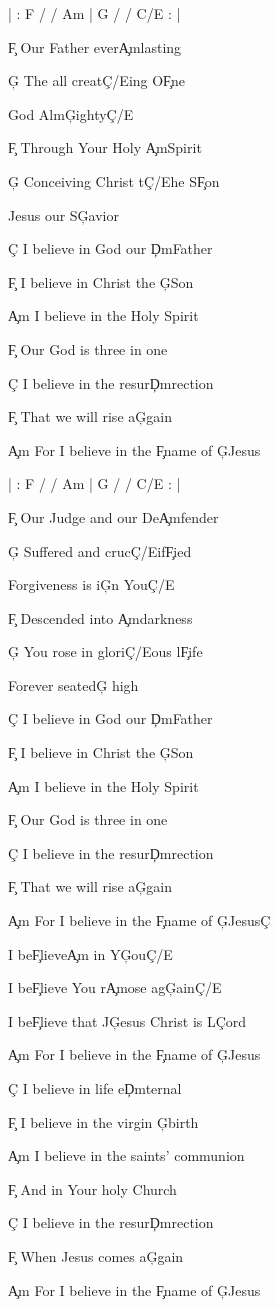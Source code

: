 \documentclass[9pt]{extarticle}
\begin{document}
\bsong

\bi
| : F / / Am  |  G / / C/E : |
\ei

\bv
\c{F} Our Father ever\c{Am}lasting

\c{G} The all creat\c{C/E}ing O\c{F}ne

God Alm\c{G}ighty\c{C/E}

\c{F} Through Your Holy \c{Am}Spirit

\c{G} Conceiving Christ t\c{C/E}he S\c{F}on

Jesus our S\c{G}avior
\ev

\bc
\c{C} I believe in God our \c{Dm}Father

\c{F} I believe in Christ the \c{G}Son

\c{Am} I believe in the Holy Spirit

\c{F} Our God is three in one

\c{C} I believe in the resur\c{Dm}rection

\c{F} That we will rise a\c{G}gain

\c{Am} For I believe in the \c{F}name of \c{G}Jesus
\ec

\bin
| : F / / Am  |  G / / C/E : |
\ein

\bv
\c{F} Our Judge and our De\c{Am}fender

\c{G} Suffered and cruc\c{C/E}if\c{F}ied

Forgiveness is i\c{G}n You\c{C/E}

\c{F} Descended into \c{Am}darkness

\c{G} You rose in glori\c{C/E}ous l\c{F}ife

Forever seated\c{G} high
\ev

\bc
\c{C} I believe in God our \c{Dm}Father

\c{F} I believe in Christ the \c{G}Son

\c{Am} I believe in the Holy Spirit

\c{F} Our God is three in one

\c{C} I believe in the resur\c{Dm}rection

\c{F} That we will rise a\c{G}gain

\c{Am} For I believe in the \c{F}name of \c{G}Jesus\c{C}
\ec

\bb[2]
I be\c{F}lieve\c{Am} in Y\c{G}ou\c{C/E}

I be\c{F}lieve You r\c{Am}ose ag\c{G}ain\c{C/E}

I be\c{F}lieve that J\c{G}esus Christ is L\c{C}ord
\eb


\bt
\c{Am} For I believe in the \c{F}name of \c{G}Jesus
\et

\bc
\c{C} I believe in life e\c{Dm}ternal

\c{F} I believe in the virgin \c{G}birth

\c{Am} I believe in the saints' communion

\c{F} And in Your holy Church

\c{C} I believe in the resur\c{Dm}rection

\c{F} When Jesus comes a\c{G}gain

\c{Am} For I believe in the \c{F}name of \c{G}Jesus
\ec



\esong
\end{document}
